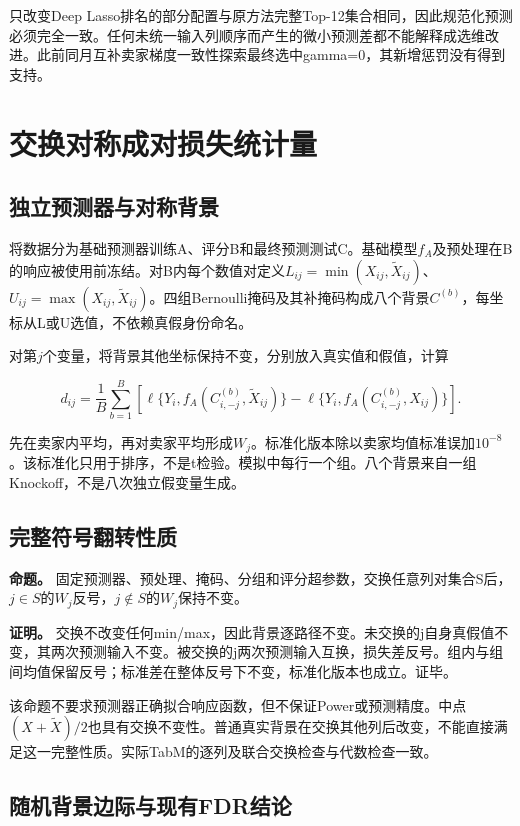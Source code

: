 \documentclass{sufethesismas}
\begin{document}
只改变Deep Lasso排名的部分配置与原方法完整Top-12集合相同，因此规范化预测必须完全一致。任何未统一输入列顺序而产生的微小预测差都不能解释成选维改进。此前同月互补卖家梯度一致性探索最终选中gamma=0，其新增惩罚没有得到支持。

\chapter{交换对称成对损失统计量}

\section{独立预测器与对称背景}

将数据分为基础预测器训练A、评分B和最终预测测试C。基础模型\(f_A\)及预处理在B的响应被使用前冻结。对B内每个数值对定义\(L_{ij}=\min(X_{ij},\widetilde X_{ij})\)、\(U_{ij}=\max(X_{ij},\widetilde X_{ij})\)。四组Bernoulli掩码及其补掩码构成八个背景\(C^{(b)}\)，每坐标从L或U选值，不依赖真假身份命名。

对第\(j\)个变量，将背景其他坐标保持不变，分别放入真实值和假值，计算

\[
d_{ij}=\frac1B\sum_{b=1}^{B}
\left[\ell\{Y_i,f_A(C^{(b)}_{i,-j},\widetilde X_{ij})\}
-\ell\{Y_i,f_A(C^{(b)}_{i,-j},X_{ij})\}\right].
\]

先在卖家内平均，再对卖家平均形成\(W_j\)。标准化版本除以卖家均值标准误加\(10^{-8}\)。该标准化只用于排序，不是t检验。模拟中每行一个组。八个背景来自一组Knockoff，不是八次独立假变量生成。

\section{完整符号翻转性质}

\textbf{命题。} 固定预测器、预处理、掩码、分组和评分超参数，交换任意列对集合S后，\(j\in S\)的\(W_j\)反号，\(j\notin S\)的\(W_j\)保持不变。

\textbf{证明。} 交换不改变任何min/max，因此背景逐路径不变。未交换的j自身真假值不变，其两次预测输入不变。被交换的j两次预测输入互换，损失差反号。组内与组间均值保留反号；标准差在整体反号下不变，标准化版本也成立。证毕。

该命题不要求预测器正确拟合响应函数，但不保证Power或预测精度。中点\((X+\widetilde X)/2\)也具有交换不变性。普通真实背景在交换其他列后改变，不能直接满足这一完整性质。实际TabM的逐列及联合交换检查与代数检查一致。

\section{随机背景边际与现有FDR结论}
\end{document}

